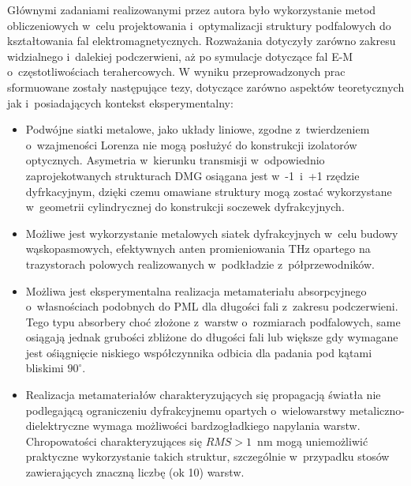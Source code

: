 Głównymi zadaniami realizowanymi przez autora było wykorzystanie metod obliczeniowych w~celu projektowania i~optymalizacji struktury podfalowych do kształtowania fal elektromagnetycznych. Rozważania dotyczyły zarówno zakresu widzialnego i~dalekiej podczerwieni, aż po symulacje dotyczące fal E-M o~częstotliwościach terahercowych. W wyniku przeprowadzonych prac sformuowane zostały następujące tezy, dotyczące zarówno aspektów teoretycznych jak i~posiadających kontekst eksperymentalny:
\begin{itemize}

\item Podwójne siatki metalowe, jako układy liniowe, zgodne z~twierdzeniem o~wzajmeności Lorenza nie mogą posłużyć do konstrukcji izolatorów optycznych. Asymetria w~kierunku transmisji w~odpowiednio zaprojekotwanych strukturach DMG osiągana jest w~-1~i~+1 rzędzie dyfrkacyjnym, dzięki czemu omawiane struktury mogą zostać wykorzystane w~geometrii cylindrycznej do konstrukcji soczewek dyfrakcyjnych.

\item Możliwe jest wykorzystanie metalowych siatek dyfrakcyjnych w~celu budowy wąskopasmowych, efektywnych anten promieniowania THz opartego na trazystorach polowych realizowanych w~podkładzie z~półprzewodników. 

\item Możliwa jest eksperymentalna realizacja metamateriału absorpcyjnego o~własnościach podobnych do PML dla długości fali z~zakresu podczerwieni. Tego typu absorbery choć złożone z~warstw o~rozmiarach podfalowych, same osiągają jednak grubości zbliżone do długości fali lub większe gdy wymagane jest ośiągnięcie niskiego współczynnika odbicia dla padania pod kątami bliskimi $90^{\circ}$.

\item Realizacja metamateriałów charakteryzujących się propagacją światła nie podlegającą ograniczeniu dyfrakcyjnemu opartych o~wielowarstwy metaliczno-dielektryczne wymaga możliwości bardzogładkiego napylania warstw. Chropowatości charakteryzująces się $RMS>1$~nm mogą uniemożliwić praktyczne wykorzystanie takich struktur, szczególnie w~przypadku stosów zawierających znaczną liczbę (ok 10) warstw.
\end{itemize}
